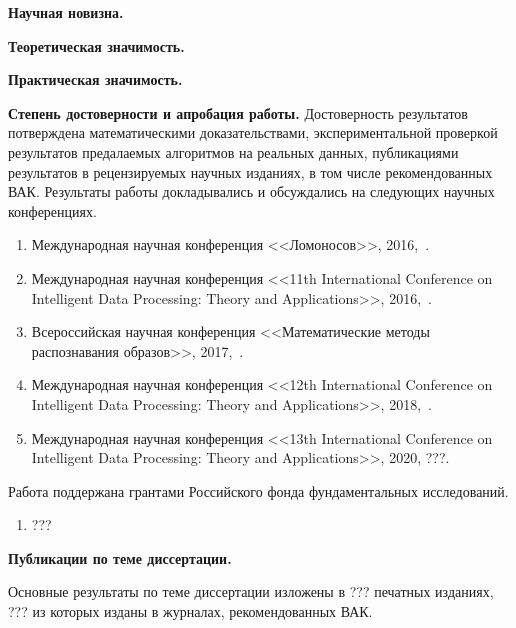 \vspace{0.5cm}
\textbf{Научная новизна.}

\vspace{0.5cm}
\textbf{Теоретическая значимость.}

\vspace{0.5cm}
\textbf{Практическая значимость.}

\vspace{0.5cm}
\textbf{Степень достоверности и апробация работы.}
Достоверность результатов потверждена математическими доказательствами, экспериментальной проверкой результатов предалаемых алгоритмов на реальных данных, публикациями результатов в рецензируемых научных изданиях, в том числе рекомендованных ВАК. 
Результаты работы докладывались и обсуждались на следующих научных конференциях.
\begin{enumerate}
	\item Международная научная конференция <<Ломоносов>>, 2016,~\cite{isachenko2016lomonosov}.
	\item Международная научная конференция  <<11th International Conference on Intelligent Data Processing: Theory and Applications>>, 2016,~\cite{Neychev2016IDP}.
	\item Всероссийская научная конференция <<Математические методы распознавания образов>>, 2017,~\cite{isachenko2017localmmro}.
	\item Международная научная конференция  <<12th International Conference on Intelligent Data Processing: Theory and Applications>>, 2018,~\cite{Isachenko2018plsidp}.
	\item Международная научная конференция  <<13th International Conference on Intelligent Data Processing: Theory and Applications>>, 2020, {\color{red} ???}.
\end{enumerate} 

Работа поддержана грантами Российского фонда фундаментальных исследований.
\begin{enumerate}
	\item {\color{red} ???}
\end{enumerate}

\vspace{0.5cm}
\textbf{Публикации по теме диссертации.}

Основные результаты по теме диссертации изложены в  {\color{red} ???} печатных изданиях, {\color{red} ???} из которых изданы в журналах, рекомендованных ВАК.

